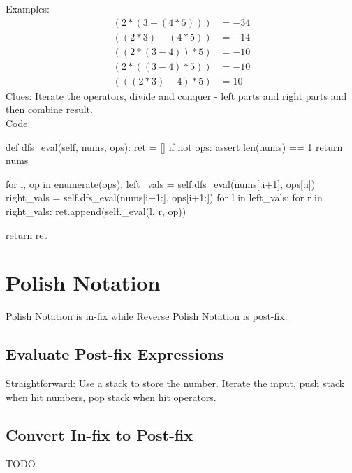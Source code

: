 Examples:
\begin{align*}
(2*(3-(4*5))) &= -34 \\
((2*3)-(4*5)) &= -14 \\
((2*(3-4))*5) &= -10 \\
(2*((3-4)*5)) &= -10 \\
(((2*3)-4)*5) &= 10
\end{align*}
Clues: Iterate the operators, divide and conquer - left parts and right parts and then combine result. \\
Code:
\begin{python}
def dfs_eval(self, nums, ops):
    ret = []
    if not ops:
        assert len(nums) == 1
        return nums

    for i, op in enumerate(ops):
        left_vals = self.dfs_eval(nums[:i+1], ops[:i])
        right_vals = self.dfs_eval(nums[i+1:], ops[i+1:])
        for l in left_vals:
            for r in right_vals:
                ret.append(self._eval(l, r, op))

    return ret
\end{python}

\section{Polish Notation}
Polish Notation is in-fix while Reverse Polish Notation is post-fix. 
\subsection{Evaluate Post-fix Expressions}
Straightforward: Use a stack to store the number. Iterate the input, push stack when
hit numbers, pop stack when hit operators.
\subsection{Convert In-fix to Post-fix}
TODO

